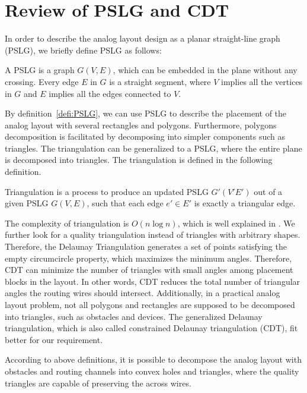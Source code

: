   \section{Review of PSLG and CDT}\label{sec:Review}

    In order to describe the analog layout design as a planar straight-line graph (PSLG), we briefly define PSLG as follows:

    \begin{defi}\label{defi:PSLG}
      A PSLG is a graph $G(V,E)$, which can be embedded in the plane without any crossing. Every edge $E$ in $G$ is a straight segment, where $V$ implies all the vertices in $G$ and $E$ implies all the edges connected to $V$. 
    \end{defi}

    By definition~\ref{defi:PSLG}, we can use PSLG to describe the placement of the analog layout with several rectangles and polygons. Furthermore, polygons decomposition is facilitated by decomposing into simpler components such as triangles. The triangulation can be generalized to a PSLG, where the entire plane is decomposed into triangles. The triangulation is defined in the following definition.

    \begin{defi}\label{defi:Triangulation}
      Triangulation is a process to produce an updated PSLG $G'(V'E')$ out of a given PSLG $G(V,E)$, such that each edge $e' \in E'$ is exactly a triangular edge.
    \end{defi}

    The complexity of triangulation is $O(n\log n)$, which is well explained in \cite{CDT}. We further look for a quality triangulation instead of triangles with arbitrary shapes. Therefore, the Delaunay Triangulation generates a set of points satisfying the empty circumcircle property, which maximizes the minimum angles. Therefore, CDT can minimize the number of triangles with small angles among placement blocks in the layout. In other words, CDT reduces the total number of triangular angles the routing wires should intersect. Additionally, in a practical analog layout problem, not all polygons and rectangles are supposed to be decomposed into triangles, such as obstacles and devices. The generalized Delaunay triangulation, which is also called constrained Delaunay triangulation (CDT), fit better for our requirement. 

    According to above definitions, it is possible to decompose the analog layout with obstacles and routing channels into convex holes and triangles, where the quality triangles are capable of preserving the across wires. 

